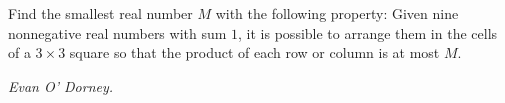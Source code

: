 Find the smallest real number $M$ with the following property: Given nine nonnegative real numbers with sum $1$, it is possible to arrange them in the cells of a $3 \times 3$ square so that the product of each row or column is at most $M$.

\textit{Evan O' Dorney.}